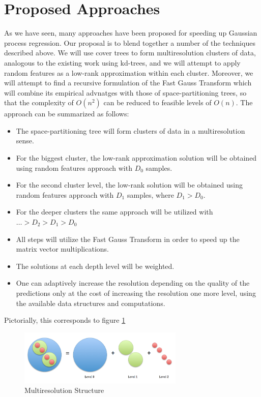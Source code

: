 \documentclass{article}
\begin{document}
\section{Proposed Approaches}
As we have seen, many approaches have been proposed for speeding up Gaussian process regression. Our proposal is to blend together a number of the techniques described above. We will use cover trees to form multiresolution clusters of data, analogous to the existing work using kd-trees, and we will attempt to apply random features as a low-rank approximation within each cluster. Moreover, we will attempt to find a recursive formulation of the Fast Gauss Transform which will combine its empirical advnatges with those of space-partitioning trees, so that the complexity of $O(n^2)$ can be reduced to feasible levels of $O(n)$. The approach can be summarized as follows:
\begin{itemize}
\item The space-partitioning tree will form clusters of data in a multiresolution sense.
\item For the biggest cluster, the low-rank approximation solution will be obtained using random features approach with $D_0$ samples.
\item For the second cluster level, the low-rank solution will be obtained using random features approach with $D_1$ samples, where $D_1>D_0$.
\item For the deeper clusters the same approach will be utilized with $\dots>D_2>D_1>D_0$
\item All steps will utilize the Fast Gauss Transform in order to speed up the matrix vector multiplications.
\item The solutions at each depth level will be weighted.
\item One can adaptively increase the resolution depending on the quality of the predictions only at the cost of increasing the resolution one more level, using the available data structures and computations.
\end{itemize}
Pictorially, this corresponds to figure \ref{fig:multiresolution}
\begin{figure}[h!] \label{fig:multiresolution}
  \caption{Multiresolution Structure}
  \centering
    \includegraphics[width=0.7\textwidth]{multiresolution}
\end{figure}
\end{document}
